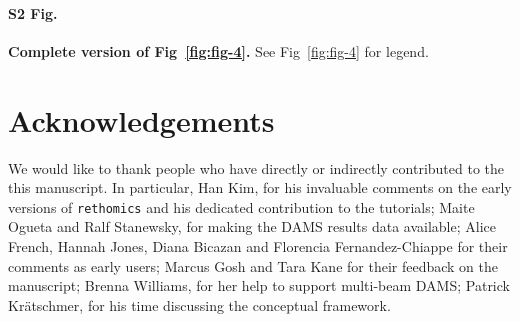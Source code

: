 \documentclass[10pt,letterpaper]{article}\usepackage[]{graphicx}\usepackage[]{color}
\begin{document}
\paragraph*{S2 Fig.}
\label{S2-Fig}
{\bf Complete version of Fig~\ref{fig:fig-4}.}
See Fig~\ref{fig:fig-4} for legend.

\section*{Acknowledgements}
We would like to thank people who have directly or indirectly contributed to the this manuscript.
In particular, Han Kim, for his invaluable comments on the early versions of \texttt{rethomics} and his dedicated contribution to the tutorials;
Maite Ogueta and Ralf Stanewsky, for making the DAMS results data available;
Alice French, Hannah Jones, Diana Bicazan and Florencia Fernandez-Chiappe for their comments as early users;
Marcus Gosh and Tara Kane for their feedback on the manuscript;
Brenna Williams, for her help to support multi-beam DAMS;
Patrick Kr{\"a}tschmer, for his time discussing the conceptual framework.




\nolinenumbers

%
%
% 



{}


\end{document}
